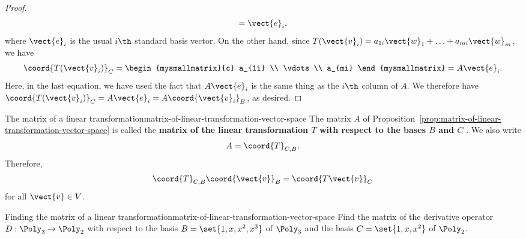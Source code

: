 \begin{proof}
\begin{equation*}
    = \vect{e}_i,
  \end{equation*}
  where $\vect{e}_i$ is the usual $i\th$ standard basis vector.  On
  the other hand, since
  $T(\vect{v}_i) = a_{1i}\vect{w}_1 + \ldots + a_{mi}\vect{w}_m$,
  we have
  \begin{equation*}
    \coord{T(\vect{v}_i)}_C =
    \begin{mysmallmatrix}{c}
      a_{1i} \\ \vdots \\ a_{mi}
    \end{mysmallmatrix}
    = A\vect{e}_i.
  \end{equation*}
  Here, in the last equation, we have used the fact that $A\vect{e}_i$
  is the same thing as the $i\th$ column of $A$. We therefore have
  $\coord{T(\vect{v}_i)}_C = A\vect{e}_i = A \coord{\vect{v}_i}_B$, as
  desired.
\end{proof}

\begin{definition}{The matrix of a linear transformation}{matrix-of-linear-transformation-vector-space}
  The matrix $A$ of
  Proposition~\ref{prop:matrix-of-linear-transformation-vector-space} is called the
  \textbf{matrix of the linear transformation\/ $T$ with respect to
    the bases $B$ and $C$}%
  .  We also
  write
  \begin{equation*}
    A = \coord{T}_{C,B}.
  \end{equation*}
  Therefore,
  \begin{equation*}
    \coord{T}_{C,B}\coord{\vect{v}}_B = \coord{T\vect{v}}_C
  \end{equation*}
  for all $\vect{v}\in V$.
\end{definition}

\begin{example}{Finding the matrix of a linear transformation}{matrix-of-linear-transformation-vector-space}
  Find the matrix of the derivative operator $D:\Poly_3\to\Poly_2$
  with respect to the basis $B=\set{1,x,x^2,x^3}$ of $\Poly_3$ and the
  basis $C=\set{1,x,x^2}$ of $\Poly_2$.
\end{example}

